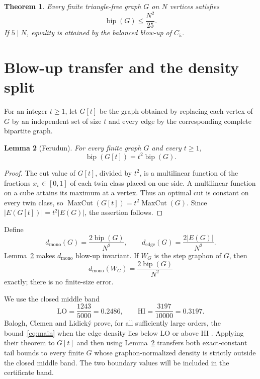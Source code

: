 \documentclass[11pt]{article}
\newtheorem{theorem}{Theorem}
\newtheorem{lemma}[theorem]{Lemma}
\newcommand{\bip}{\operatorname{bip}}
\newcommand{\mc}{\operatorname{MaxCut}}
\newcommand{\dmono}{d_{\mathrm{mono}}}
\newcommand{\dedge}{d_{\mathrm{edge}}}
\begin{document}
\begin{theorem}\label{thm:main}
Every finite triangle-free graph $G$ on $N$ vertices satisfies
\[
  \bip(G)\le \frac{N^2}{25}.
\]
If $5\mid N$, equality is attained by the balanced blow-up of $C_5$.
\end{theorem}

\section{Blow-up transfer and the density split}

For an integer $t\ge1$, let $G[t]$ be the graph obtained by replacing each
vertex of $G$ by an independent set of size $t$ and every edge by the
corresponding complete bipartite graph.

\begin{lemma}[Ferudun]\label{lem:blowup}
For every finite graph $G$ and every $t\ge1$,
\[
  \bip(G[t])=t^2\bip(G).
\]
\end{lemma}

\begin{proof}
The cut value of $G[t]$, divided by $t^2$, is a multilinear function of the
fractions $x_v\in[0,1]$ of each twin class placed on one side.  A multilinear
function on a cube attains its maximum at a vertex.  Thus an optimal cut is
constant on every twin class, so $\mc(G[t])=t^2\mc(G)$.  Since
$|E(G[t])|=t^2|E(G)|$, the assertion follows.
\end{proof}

Define
\[
  \dmono(G)=\frac{2\bip(G)}{N^2},\qquad
  \dedge(G)=\frac{2|E(G)|}{N^2}.
\]
Lemma~\ref{lem:blowup} makes $\dmono$ blow-up invariant.  If $W_G$ is the
step graphon of $G$, then
\begin{equation}\label{eq:exact-transfer}
  \dmono(W_G)=\frac{2\bip(G)}{N^2}
\end{equation}
exactly; there is no finite-size error.

We use the closed middle band
\[
  \mathrm{LO}=\frac{1243}{5000}=0.2486,
  \qquad
  \mathrm{HI}=\frac{3197}{10000}=0.3197.
\]
Balogh, Clemen and Lidick\'y prove, for all sufficiently large orders, the
bound~\eqref{eq:main} when the edge density lies below LO or above HI
\cite[Theorem 1.3]{BCL}.  Applying their theorem to $G[t]$ and then using
Lemma~\ref{lem:blowup} transfers both exact-constant tail bounds to every
finite $G$ whose graphon-normalized density is strictly outside the closed
middle band.  The two boundary values will be included in the certificate
band.
\end{document}
